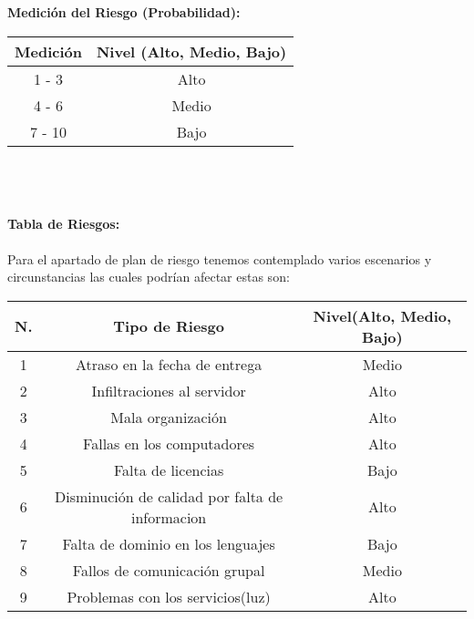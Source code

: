 \documentclass[40pt]{article}
\begin{document}
\maketitle
\textsf{\ \\
\\
\textbf{Medición del Riesgo (Probabilidad):} \\}

\begin{tabular}{| c | c |} \hline
\textbf{Medición} & \textbf{Nivel (Alto, Medio, Bajo)} \\ \hline
1 - 3 & Alto \\ \hline
4 - 6 & Medio \\ \hline
7 - 10& Bajo \\ \hline
\end{tabular}

\maketitle
\textsf{\ \\
\\
\\
\textbf{Tabla de Riesgos:}\\
\\
Para el apartado de plan de riesgo tenemos contemplado
varios escenarios y circunstancias las cuales podrían afectar
estas son: \\}

\begin{tabular}{| c | c | c |} \hline
\textbf{N.} & \textbf{Tipo de Riesgo} & \textbf{Nivel(Alto, Medio, Bajo)} \\ \hline
1 & Atraso en la fecha de entrega & Medio \\ \hline
2 & Infiltraciones al servidor & Alto \\ \hline
3 & Mala organización & Alto \\ \hline
4 & Fallas en los computadores & Alto \\ \hline
5 & Falta de licencias & Bajo \\ \hline
6 & Disminución de calidad por falta de informacion & Alto \\ \hline
7 & Falta de dominio en los lenguajes & Bajo \\ \hline
8 & Fallos de comunicación grupal & Medio \\ \hline
9 & Problemas con los servicios(luz) & Alto \\ \hline
\end{tabular}
\end{document}
